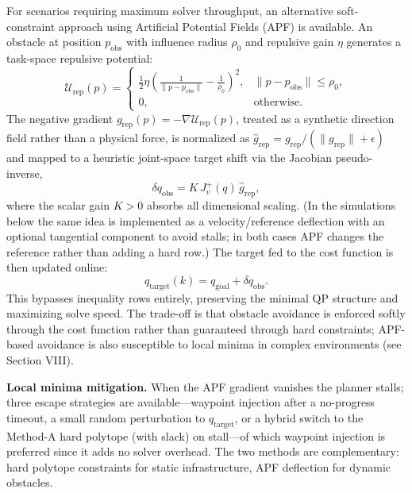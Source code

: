 For scenarios requiring maximum solver throughput, an alternative
soft-constraint approach using Artificial Potential Fields (APF) \cite{khatib1986}
is available. An obstacle at position \(p_{\text{obs}}\) with influence
radius \(\rho_0\) and repulsive gain \(\eta\) generates a task-space
repulsive potential:
\begin{equation}
\label{eq:apf-potential}
\mathcal{U}_{\text{rep}}(p) =
\begin{cases}
\frac{1}{2} \eta
\left(\frac{1}{\|p - p_{\text{obs}}\|} - \frac{1}{\rho_0}\right)^2,
& \|p - p_{\text{obs}}\| \leq \rho_0,\\
0, & \text{otherwise}.
\end{cases}
\end{equation}
The negative gradient
\(g_{\text{rep}}(p)=-\nabla \mathcal{U}_{\text{rep}}(p)\), treated as a
synthetic direction field rather than a physical force, is normalized as
\(\hat{g}_{\text{rep}}=g_{\text{rep}}/(\|g_{\text{rep}}\|+\epsilon)\) and
mapped to a heuristic joint-space target shift via the Jacobian
pseudo-inverse,
\begin{equation}
\label{eq:apf-target-shift}
\delta q_{\text{obs}} = K \, J_v^+(q) \, \hat{g}_{\text{rep}},
\end{equation}
where the scalar gain \(K > 0\) absorbs all dimensional scaling. (In the
simulations below the same idea is implemented as a velocity/reference
deflection with an optional tangential component to avoid stalls; in both
cases APF changes the reference rather than adding a hard row.) The target
fed to the cost function is then updated online:
\begin{equation}
\label{eq:apf-target}
q_{\text{target}}(k) = q_{\text{goal}} + \delta q_{\text{obs}} .
\end{equation}
This bypasses inequality rows entirely, preserving the minimal QP
structure and maximizing solve speed. The trade-off is that obstacle
avoidance is enforced softly through the cost function rather than
guaranteed through hard constraints; APF-based avoidance is also
susceptible to local minima in complex environments (see Section VIII).

\textbf{Local minima mitigation.} When the APF gradient vanishes the
planner stalls; three escape strategies are available---waypoint
injection after a no-progress timeout, a small random perturbation to
\(q_\text{target}\), or a hybrid switch to the Method-A hard polytope
(with slack) on stall---of which waypoint injection is preferred since it
adds no solver overhead. The two methods are complementary: hard polytope
constraints for static infrastructure, APF deflection for dynamic
obstacles.

